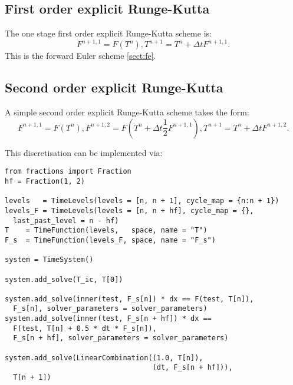 \documentclass[a4paper]{book}
\begin{document}
\subsection{First order explicit Runge-Kutta}

The one stage first order explicit Runge-Kutta scheme is:
\begin{subequations}
  \begin{equation}
    F^{n + 1,1} = F \left( T^n \right),
  \end{equation}
  \begin{equation}
    T^{n + 1} = T^n + \Delta t F^{n + 1,1}.
  \end{equation}
\end{subequations}
This is the forward Euler scheme \ref{sect:fe}.

\subsection{Second order explicit Runge-Kutta}\label{sect:rk2}

A simple second order explicit Runge-Kutta scheme takes the form:
\begin{subequations}
  \begin{equation}
    F^{n + 1,1} = F \left( T^n \right),
  \end{equation}
  \begin{equation}
    F^{n + 1,2} = F \left( T^n + \Delta t \frac{1}{2} F^{n + 1,1} \right),
  \end{equation}
  \begin{equation}
    T^{n + 1} = T^n + \Delta t F^{n + 1,2}.
  \end{equation}
\end{subequations}

This discretisation can be implemented via:
\begin{lstlisting}
from fractions import Fraction
hf = Fraction(1, 2)

levels   = TimeLevels(levels = [n, n + 1], cycle_map = {n:n + 1})
levels_F = TimeLevels(levels = [n, n + hf], cycle_map = {},
  last_past_level = n - hf)
T    = TimeFunction(levels,   space, name = "T")
F_s  = TimeFunction(levels_F, space, name = "F_s")

system = TimeSystem()

system.add_solve(T_ic, T[0])

system.add_solve(inner(test, F_s[n]) * dx == F(test, T[n]),
  F_s[n], solver_parameters = solver_parameters)
system.add_solve(inner(test, F_s[n + hf]) * dx ==
  F(test, T[n] + 0.5 * dt * F_s[n]),
  F_s[n + hf], solver_parameters = solver_parameters)
  
system.add_solve(LinearCombination((1.0, T[n]),
                                   (dt, F_s[n + hf])),
  T[n + 1])
\end{lstlisting}
\end{document}

